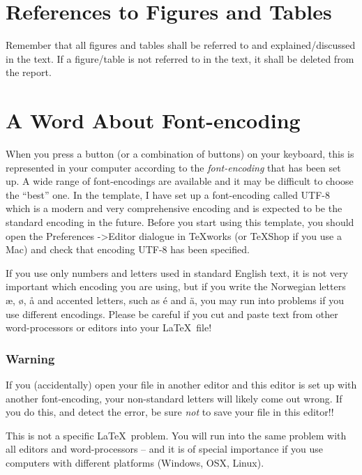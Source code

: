 \section{References to Figures and Tables}
Remember that all figures and tables shall be referred to and explained/discussed in the text. If a figure/table is not referred to in the text, it shall be deleted from the report.
\section{A Word About Font-encoding}
When you press a button (or a combination of buttons) on your keyboard, this is represented in your computer according to the \emph{font-encoding} that has been set up. A wide range of font-encodings are available and it may be difficult to choose the ``best'' one. In the template, I have set up a font-encoding called UTF-8 which is a modern and very comprehensive encoding and is expected to be the standard encoding in the future. Before you start using this template, you should open the Preferences ->Editor dialogue in TeXworks (or TeXShop if you use a Mac) and check that encoding UTF-8 has been specified. 

If you use only numbers and letters used in standard English text, it is not very important which encoding you are using, but if you write the Norwegian letters æ, ø, å and accented letters, such as é and ä, you may run into problems if you use different encodings. Please be careful if you cut and paste text from other word-processors or editors into your \LaTeX\ file!

\subsubsection*{Warning}
If you (accidentally) open your file in another editor and this editor is set up with another font-encoding, your non-standard letters will likely come out wrong. If you do this, and detect the error, be sure \emph{not} to save your file in this editor!!

This is not a specific \LaTeX\ problem. You will run into the same problem with all editors and word-processors -- and it is of special importance if you use computers with different platforms (Windows, OSX, Linux).

